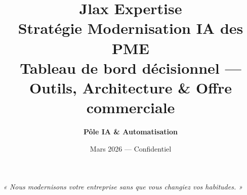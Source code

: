 \documentclass[12pt, a4paper]{article}
\title{%
  {\color{navydark}\Huge\bfseries Jlax Expertise}\\[0.8em]
  {\color{navylight}\Large Stratégie Modernisation IA des PME}\\[0.4em]
  {\normalsize\color{gray} Tableau de bord décisionnel — Outils, Architecture \& Offre commerciale}
}
\author{\textbf{Pôle IA \& Automatisation}}
\date{Mars 2026 — Confidentiel}
\begin{document}
\maketitle
\thispagestyle{empty}

\vspace{1em}
\begin{center}
  \begin{minipage}{0.8\textwidth}
    \centering
    \color{gray}\itshape
    « Nous modernisons votre entreprise sans que vous changiez vos habitudes. »
  \end{minipage}
\end{center}

\vspace{2em}
\tableofcontents
\newpage


\newpage


\newpage


\newpage


\newpage


\end{document}
